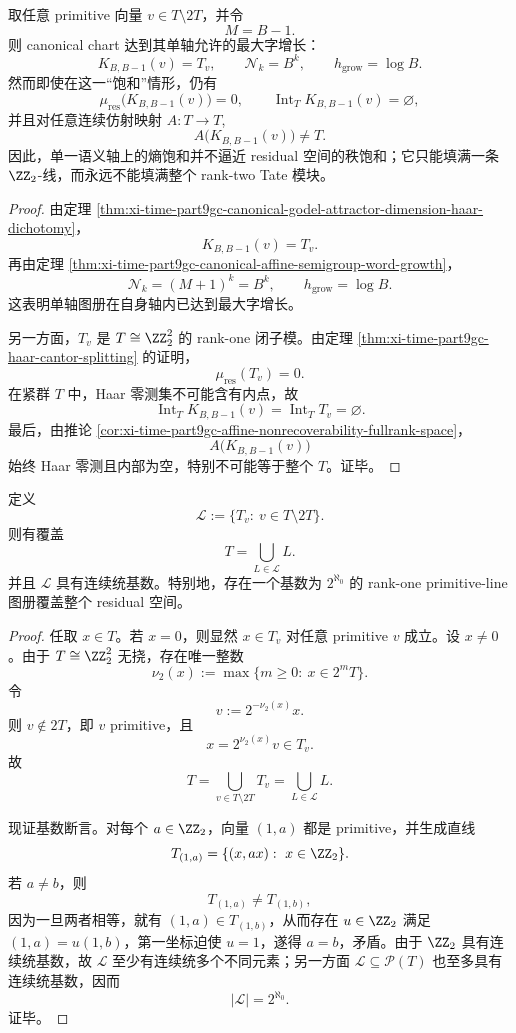 \begin{theorem}\label{thm:conclusion-tate-uniaxial-entropy-saturation-rank-decoupling}
取任意 primitive 向量 \(v\in T\setminus 2T\)，并令
\[
M=B-1.
\]
则 canonical chart 达到其单轴允许的最大字增长：
\[
K_{B,B-1}(v)=T_v,
\qquad
\mathcal N_k=B^k,
\qquad
h_{\mathrm{grow}}=\log B.
\]
然而即使在这一“饱和”情形，仍有
\[
\mu_{\mathrm{res}}\bigl(K_{B,B-1}(v)\bigr)=0,
\qquad
\operatorname{Int}_T K_{B,B-1}(v)=\varnothing,
\]
并且对任意连续仿射映射 \(A:T\to T\),
\[
A\bigl(K_{B,B-1}(v)\bigr)\neq T.
\]
因此，单一语义轴上的熵饱和并不逼近 residual 空间的秩饱和；它只能填满一条 \(\ZZ_2\)-线，而永远不能填满整个 rank-two Tate 模块。
\end{theorem}
\begin{proof}
由定理 \ref{thm:xi-time-part9gc-canonical-godel-attractor-dimension-haar-dichotomy}，
\[
K_{B,B-1}(v)=T_v.
\]
再由定理 \ref{thm:xi-time-part9gc-canonical-affine-semigroup-word-growth}，
\[
\mathcal N_k=(M+1)^k=B^k,
\qquad
h_{\mathrm{grow}}=\log B.
\]
这表明单轴图册在自身轴内已达到最大字增长。

另一方面，\(T_v\) 是 \(T\cong \ZZ_2^2\) 的 rank-one 闭子模。由定理 \ref{thm:xi-time-part9gc-haar-cantor-splitting} 的证明，
\[
\mu_{\mathrm{res}}(T_v)=0.
\]
在紧群 \(T\) 中，Haar 零测集不可能含有内点，故
\[
\operatorname{Int}_T K_{B,B-1}(v)
=
\operatorname{Int}_T T_v
=
\varnothing.
\]
最后，由推论 \ref{cor:xi-time-part9gc-affine-nonrecoverability-fullrank-space}，
\[
A\bigl(K_{B,B-1}(v)\bigr)
\]
始终 Haar 零测且内部为空，特别不可能等于整个 \(T\)。证毕。
\end{proof}

\begin{proposition}\label{prop:conclusion-tate-primitive-line-atlas-continuum-upper-bound}
定义
\[
\mathcal L:=\{T_v:\ v\in T\setminus 2T\}.
\]
则有覆盖
\[
T=\bigcup_{L\in \mathcal L}L.
\]
并且 \(\mathcal L\) 具有连续统基数。特别地，存在一个基数为 \(2^{\aleph_0}\) 的 rank-one primitive-line 图册覆盖整个 residual 空间。
\end{proposition}
\begin{proof}
任取 \(x\in T\)。若 \(x=0\)，则显然 \(x\in T_v\) 对任意 primitive \(v\) 成立。设 \(x\neq 0\)。由于 \(T\cong \ZZ_2^2\) 无挠，存在唯一整数
\[
\nu_2(x):=\max\{m\ge 0:\ x\in 2^mT\}.
\]
令
\[
v:=2^{-\nu_2(x)}x.
\]
则 \(v\notin 2T\)，即 \(v\) primitive，且
\[
x=2^{\nu_2(x)}v\in T_v.
\]
故
\[
T=\bigcup_{v\in T\setminus 2T}T_v
=
\bigcup_{L\in \mathcal L}L.
\]

现证基数断言。对每个 \(a\in \ZZ_2\)，向量 \((1,a)\) 都是 primitive，并生成直线
\[
T_{(1,a)}=\{(x,ax):\ x\in \ZZ_2\}.
\]
若 \(a\neq b\)，则
\[
T_{(1,a)}\neq T_{(1,b)},
\]
因为一旦两者相等，就有 \((1,a)\in T_{(1,b)}\)，从而存在 \(u\in \ZZ_2\) 满足 \((1,a)=u(1,b)\)，第一坐标迫使 \(u=1\)，遂得 \(a=b\)，矛盾。由于 \(\ZZ_2\) 具有连续统基数，故 \(\mathcal L\) 至少有连续统多个不同元素；另一方面 \(\mathcal L\subseteq \mathcal P(T)\) 也至多具有连续统基数，因而
\[
|\mathcal L|=2^{\aleph_0}.
\]
证毕。
\end{proof}

